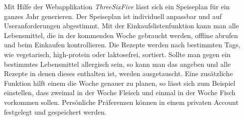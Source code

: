Mit Hilfe der Webapplikation \textit{ThreeSixFive} lässt sich ein Speiseplan für ein ganzes Jahr generieren. Der Speiseplan ist individuell anpassbar und auf Useranforderungen abgestimmt. 
Mit der Einkaufslistenfunktion kann man alle Lebensmittel, die in der kommenden Woche gebraucht werden, offline abrufen und beim Einkaufen kontrollieren. Die Rezepte werden nach bestimmten Tags, wie vegetarisch, high-protein oder laktosefrei, sortiert. Sollte man gegen ein bestimmtes Lebensmittel allergisch sein, so kann man das angeben und alle Rezepte in denen dieses enthalten ist, werden ausgetauscht. Eine zusätzliche Funktion hilft einem die Woche genauer zu planen, so lässt sich zum Beispiel einstellen, dass zweimal in der Woche Fleisch und einmal in der Woche Fisch vorkommen sollen. Persönliche Präferenzen können in einem privaten Account festgelegt und gespeichert werden.